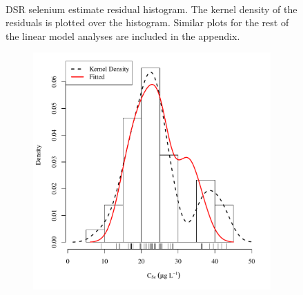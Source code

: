 \begin{linenumbers}
\begin{landscape}
\begin{figure}
\begin{subfigure}{0.7\textwidth}
		\end{subfigure}\\
		\caption[DSR selenium estimate residual histogram.]{DSR selenium estimate residual histogram.  The kernel density of the residuals is plotted over the histogram.  Similar plots for the rest of the linear model analyses are included in the appendix.}
		\label{fig:concResHist_DS}
	\end{figure}
\end{landscape}

\subfiguremid
\begin{landscape}
	\begin{figure}
		\begin{subfigure}{0.7\textwidth}
			\centering
			\includegraphics[width=\tableCustomSize]{"Figures/Results_DSR/Stochastic/Conc Model ResDist BIG"}
		\end{subfigure}%
		\begin{subfigure}{0.7\textwidth}
			\centering

\end{subfigure}
\end{figure}
\end{landscape}
\end{linenumbers}
